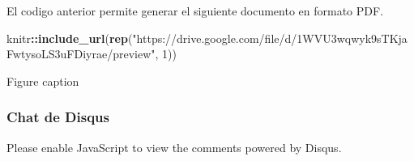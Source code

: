 \documentclass[]{article}
\newenvironment{Shaded}{\begin{snugshade}}{\end{snugshade}}
\newcommand{\DecValTok}[1]{\textcolor[rgb]{0.00,0.00,0.81}{#1}}
\newcommand{\KeywordTok}[1]{\textcolor[rgb]{0.13,0.29,0.53}{\textbf{#1}}}
\newcommand{\NormalTok}[1]{#1}
\newcommand{\OperatorTok}[1]{\textcolor[rgb]{0.81,0.36,0.00}{\textbf{#1}}}
\newcommand{\StringTok}[1]{\textcolor[rgb]{0.31,0.60,0.02}{#1}}
\begin{document}
El codigo anterior permite generar el siguiente documento en formato
PDF.

\begin{Shaded}
\begin{Highlighting}[]
\NormalTok{knitr}\OperatorTok{::}\KeywordTok{include_url}\NormalTok{(}\KeywordTok{rep}\NormalTok{(}\StringTok{"https://drive.google.com/file/d/1WVU3wqwyk9sTKjaFwtysoLS3uFDiyrae/preview"}\NormalTok{, }\DecValTok{1}\NormalTok{))}
\end{Highlighting}
\end{Shaded}

Figure caption

\hypertarget{chat-de-disqus}{%
\subsubsection{Chat de Disqus}\label{chat-de-disqus}}

\hypertarget{disqus_thread}{}

Please enable JavaScript to view the comments powered by Disqus.
\end{document}
